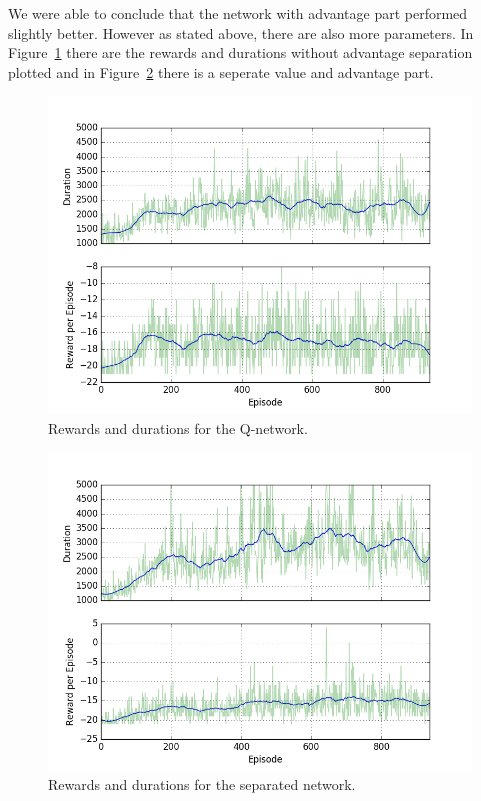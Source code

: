 \documentclass[10pt,a4paper]{article}
\begin{document}
We were able to conclude that the network with advantage part performed slightly better. However as stated above, there are also more parameters. In Figure~\ref{fig:no_advantage} there are the rewards and durations without advantage separation plotted and in Figure~\ref{fig:with_advantage} there is a seperate value and advantage part.

\begin{figure}[!ht]
  \centering
  \includegraphics[width=1\textwidth]{./figures/no_advantage.png}
  \caption{Rewards and durations for the Q-network.}
  \label{fig:no_advantage}
\end{figure}

\begin{figure}[!ht]
  \centering
  \includegraphics[width=1\textwidth]{./figures/tanh_corrected_features.png}
  \caption{Rewards and durations for the separated network.}
  \label{fig:with_advantage}
\end{figure}
\end{document}
